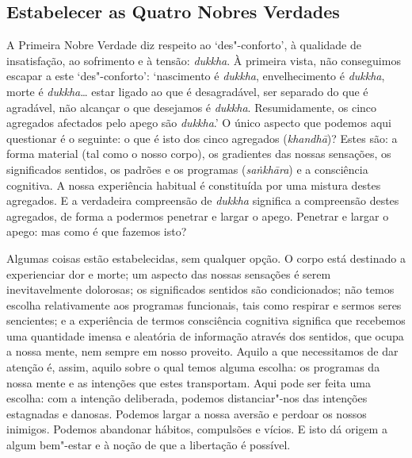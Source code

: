 \subsection{Estabelecer as Quatro Nobres Verdades}

A Primeira Nobre Verdade diz respeito ao `des"-conforto', à qualidade de
insatisfação, ao sofrimento e à tensão: \emph{dukkha}. À primeira vista, não
conseguimos escapar a este `des"-conforto': `nascimento é \emph{dukkha},
envelhecimento é \emph{dukkha}, morte é \emph{dukkha}\ldots{} estar ligado ao
que é desagradável, ser separado do que é agradável, não alcançar o que
desejamos é \emph{dukkha}. Resumidamente, os cinco agregados afectados pelo
apego são \emph{dukkha}.'
O único aspecto que podemos aqui questionar é o seguinte: o que é isto dos cinco
agregados (\emph{khandhā})? Estes são: a forma material (tal como o nosso
corpo), os gradientes das nossas sensações, os significados sentidos, os padrões
e os programas (\emph{saṅkhāra}) e a consciência cognitiva. A nossa experiência
habitual é constituída por uma mistura destes agregados. E a verdadeira
compreensão de \emph{dukkha} significa a compreensão destes agregados, de forma
a podermos penetrar e largar o apego. Penetrar e largar o apego: mas como é que
fazemos isto?

Algumas coisas estão estabelecidas, sem qualquer opção. O corpo está destinado a
experienciar dor e morte; um aspecto das nossas sensações é serem
inevitavelmente dolorosas; os significados sentidos são condicionados; não temos
escolha relativamente aos programas funcionais, tais como respirar e sermos
seres sencientes; e a experiência de termos consciência cognitiva significa que
recebemos uma quantidade imensa e aleatória de informação através dos sentidos,
que ocupa a nossa mente, nem sempre em nosso proveito. Aquilo a que necessitamos
de dar atenção é, assim, aquilo sobre o qual temos alguma escolha: os programas
da nossa mente e as intenções que estes transportam. Aqui pode ser feita uma
escolha: com a intenção deliberada, podemos distanciar"-nos das intenções
estagnadas e danosas. Podemos largar a nossa aversão e perdoar os nossos
inimigos. Podemos abandonar hábitos, compulsões e vícios. E isto dá origem a
algum bem"-estar e à noção de que a libertação é possível.

